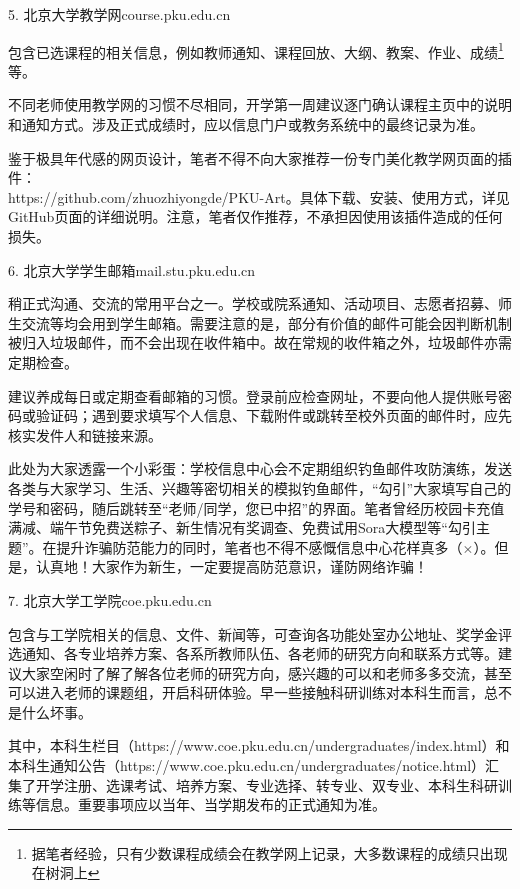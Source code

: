 \documentclass[11pt,oneside]{book}
\begin{document}
5. 北京大学教学网\quad course.pku.edu.cn

包含已选课程的相关信息，例如教师通知、课程回放、大纲、教案、作业、成绩\footnote{据笔者经验，只有少数课程成绩会在教学网上记录，大多数课程的成绩只出现在树洞上}等。

不同老师使用教学网的习惯不尽相同，开学第一周建议逐门确认课程主页中的说明和通知方式。涉及正式成绩时，应以信息门户或教务系统中的最终记录为准。

鉴于极具年代感的网页设计，笔者不得不向大家推荐一份专门美化教学网页面的插件：\\https://github.com/zhuozhiyongde/PKU-Art。具体下载、安装、使用方式，详见GitHub页面的详细说明。注意，笔者仅作推荐，不承担因使用该插件造成的任何损失。

\vspace{10pt}

6. 北京大学学生邮箱\quad mail.stu.pku.edu.cn 

稍正式沟通、交流的常用平台之一。学校或院系通知、活动项目、志愿者招募、师生交流等均会用到学生邮箱。需要注意的是，部分有价值的邮件可能会因判断机制被归入垃圾邮件，而不会出现在收件箱中。故在常规的收件箱之外，垃圾邮件亦需定期检查。

建议养成每日或定期查看邮箱的习惯。登录前应检查网址，不要向他人提供账号密码或验证码；遇到要求填写个人信息、下载附件或跳转至校外页面的邮件时，应先核实发件人和链接来源。

\vspace{10pt}

此处为大家透露一个小彩蛋：学校信息中心会不定期组织钓鱼邮件攻防演练，发送各类与大家学习、生活、兴趣等密切相关的模拟钓鱼邮件，“勾引”大家填写自己的学号和密码，随后跳转至“老师/同学，您已中招”的界面。笔者曾经历校园卡充值满减、端午节免费送粽子、新生情况有奖调查、免费试用Sora大模型等“勾引主题”。在提升诈骗防范能力的同时，笔者也不得不感慨信息中心花样真多（$\times$）。但是，认真地！大家作为新生，一定要提高防范意识，谨防网络诈骗！

\vspace{10pt}

7. 北京大学工学院\quad coe.pku.edu.cn

包含与工学院相关的信息、文件、新闻等，可查询各功能处室办公地址、奖学金评选通知、各专业培养方案、各系所教师队伍、各老师的研究方向和联系方式等。建议大家空闲时了解了解各位老师的研究方向，感兴趣的可以和老师多多交流，甚至可以进入老师的课题组，开启科研体验。早一些接触科研训练对本科生而言，总不是什么坏事。

其中，本科生栏目（https://www.coe.pku.edu.cn/undergraduates/index.html）和本科生通知公告（https://www.coe.pku.edu.cn/undergraduates/notice.html）汇集了开学注册、选课考试、培养方案、专业选择、转专业、双专业、本科生科研训练等信息。重要事项应以当年、当学期发布的正式通知为准。
\end{document}
